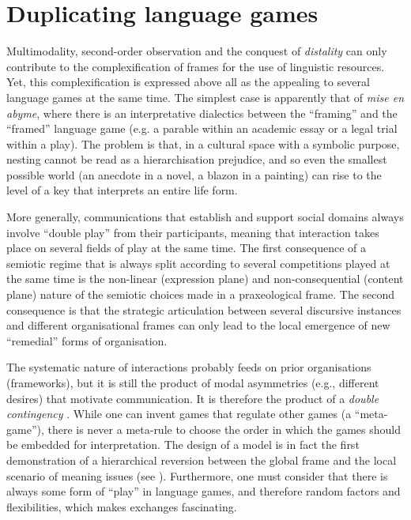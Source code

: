 \documentclass[output=paper]{langscibook}
\begin{document}
\section{Duplicating language games} %

Multimodality, second-order observation and the conquest of \textit{distality} can only contribute to the complexification of frames for the use of linguistic resources. Yet, this complexification is expressed above all as the appealing to several language games at the same time. The simplest case is apparently that of \textit{mise en abyme}, where there is an interpretative dialectics between the “framing” and the “framed” language game (e.g. a parable within an academic essay or a legal trial within a play). The problem is that, in a cultural space with a symbolic purpose, nesting cannot be read as a hierarchisation prejudice, and so even the smallest possible world (an anecdote in a novel, a blazon in a painting) can rise to the level of a key that interprets an entire life form.

More generally, communications that establish and support social domains always involve “double play” from their participants, meaning that interaction takes place on several fields of play at the same time. The first consequence of a semiotic regime that is always split according to several competitions played at the same time is the non-linear (expression plane) and non-consequential (content plane) nature of the semiotic choices made in a praxeological frame. The second consequence is that the strategic articulation between several discursive instances and different organisational frames can only lead to the local emergence of new “remedial” forms of organisation. 

The systematic nature of interactions probably feeds on prior organisations (frameworks), but it is still the product of modal asymmetries (e.g., different desires) that motivate communication. It is therefore the product of a \textit{double contingency} \citep{Luhmann1995Social}. While one can invent games that regulate other games (a “meta-game”), there is never a meta-rule to choose the order in which the games should be embedded for interpretation. The design of a model is in fact the first demonstration of a hierarchical reversion between the global frame and the local scenario of meaning issues (see ). Furthermore, one must consider that there is always some form of “play” in language games, and therefore random factors and flexibilities, which makes exchanges fascinating.
\end{document}
